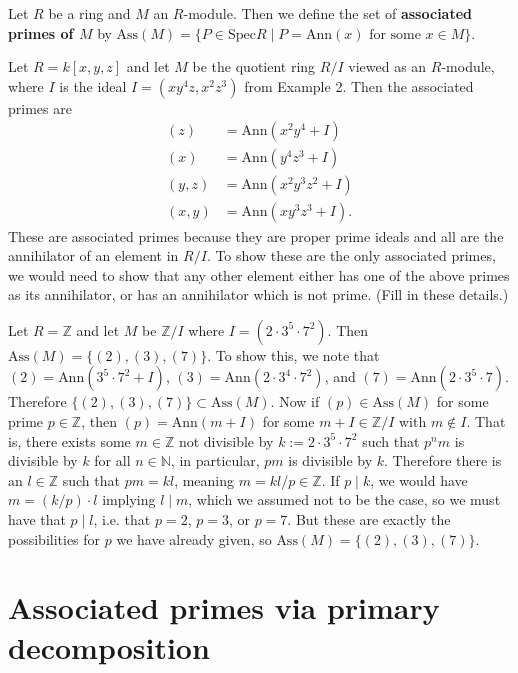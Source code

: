 \documentclass[12pt]{article}
\newenvironment{example}[2][Example]{\begin{trivlist}
\item[\hskip \labelsep {\bfseries #1}\hskip \labelsep {\bfseries #2.}]}{\end{trivlist}}
\newenvironment{definition}[2][Definition]{\begin{trivlist}
\item[\hskip \labelsep {\bfseries #1}\hskip \labelsep {\bfseries #2.}]}{\end{trivlist}}
\newcommand{\N}{\mathbb{N}}
\newcommand{\Z}{\mathbb{Z}}
\newcommand{\ass}{\text{Ass}}
\newcommand{\ann}{\text{Ann}}
\newcommand{\spec}{\text{Spec}}
\begin{document}
\begin{definition}{4}
	Let $R$ be a ring and $M$ an $R$-module. Then we define the set of \textbf{associated primes of $M$} by $\ass(M) = \{P \in \spec R \mid P = \ann(x) \text{ for some } x \in M\}$.
\end{definition}


\begin{example}{4}
	Let $R = k[x,y,z]$ and let $M$ be the quotient ring $R/I$ viewed as an $R$-module, where $I$ is the ideal $I = (xy^4z, x^2z^3)$ from Example 2. Then the associated primes are \begin{align*}
		(z) &= \ann(x^2y^4 + I) \\
		(x) &= \ann(y^4z^3 + I) \\
		(y,z) &= \ann(x^2 y^3 z^2 + I) \\
		(x,y) &= \ann(x y^3 z^3 + I).
	\end{align*} These are associated primes because they are proper prime ideals and all are the annihilator of an element in $R/I$. To show these are the only associated primes, we would need to show that any other element either has one of the above primes as its annihilator, or has an annihilator which is not prime. \color{red} (Fill in these details.)
\end{example}


\begin{example}{5}
	Let $R = \Z$ and let $M$ be $\Z / I$ where $I = (2 \cdot 3^5 \cdot 7^2)$. Then $\ass(M) = \{(2), (3), (7)\}$. To show this, we note that $(2) = \ann(3^5 \cdot 7^2 + I)$, $(3) = \ann(2 \cdot 3^4 \cdot 7^2)$, and $(7) = \ann(2 \cdot 3^5 \cdot 7)$. Therefore $\{(2), (3), (7)\} \subset \ass(M)$. Now if $(p) \in \ass(M)$ for some prime $p \in \Z$, then $(p) = \ann(m + I)$ for some $m + I \in \Z/I$ with $m \notin I$. That is, there exists some $m \in \Z$ not divisible by $k := 2 \cdot 3^5 \cdot 7^2$ such that $p^n m$ is divisible by $k$ for all $n \in \N$, in particular, $pm$ is divisible by $k$. Therefore there is an $l \in \Z$ such that $pm = kl$, meaning $m = kl / p \in \Z$. If $p \mid k$, we would have $m = (k/p) \cdot l$ implying $l \mid m$, which we assumed not to be the case, so we must have that $p \mid l$, i.e. that $p = 2$, $p = 3$, or $p = 7$. But these are exactly the possibilities for $p$ we have already given, so $\ass(M) = \{(2), (3), (7)\}$. 
\end{example}


\section{Associated primes via primary decomposition}
\end{document}
